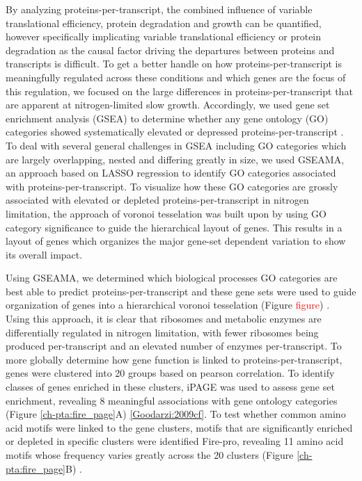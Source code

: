 By analyzing proteins-per-transcript, the combined influence of variable translational efficiency, protein degradation and growth can be quantified, however specifically implicating variable translational efficiency or protein degradation as the causal factor driving the departures between proteins and transcripts is difficult. To get a better handle on how proteins-per-transcript is meaningfully regulated across these conditions and which genes are the focus of this regulation, we focused on the large differences in proteins-per-transcript that are apparent at nitrogen-limited slow growth. Accordingly, we used gene set enrichment analysis (GSEA) to determine whether any gene ontology (GO) categories showed systematically elevated or depressed proteins-per-transcript \cite{Subramanian:2005jt}. To deal with several general challenges in GSEA including GO categories which are largely overlapping, nested and differing greatly in size, we used GSEAMA, an approach based on LASSO regression \cite{Tibshirani:1996wb} to identify GO categories associated with proteins-per-transcript. To visualize how these GO categories are grossly associated with elevated or depleted proteins-per-transcript in nitrogen limitation, the approach of voronoi tesselation \cite{Otto:2010br} was built upon by using GO category significance to guide the hierarchical layout of genes. This results in a layout of genes which organizes the major gene-set dependent variation to show its overall impact.

Using GSEAMA, we determined which biological processes GO categories are best able to predict proteins-per-transcript and these gene sets were used to guide organization of genes into a hierarchical voronoi tesselation (Figure \textcolor{red}{figure}) \cite{Halligan:2007ds}.  Using this approach, it is clear that ribosomes and metabolic enzymes are differentially regulated in nitrogen limitation, with fewer ribosomes being produced per-transcript and an elevated number of enzymes per-transcript. To more globally determine how gene function is linked to proteins-per-transcript, genes were clustered into 20 groups based on pearson correlation.  To identify classes of genes enriched in these clusters, iPAGE was used to assess gene set enrichment, revealing 8 meaningful associations with gene ontology categories (Figure \ref{ch-pta:fire_page}A) \ref{Goodarzi:2009cf}. To test whether common amino acid motifs were linked to the gene clusters, motifs that are significantly enriched or depleted in specific clusters were identified Fire-pro, revealing 11 amino acid motifs whose frequency varies greatly across the 20 clusters (Figure \ref{ch-pta:fire_page}B) \cite{Lieber:2010fr}.

